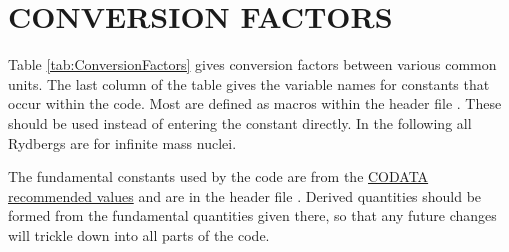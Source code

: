 \chapter{CONVERSION FACTORS}

Table \ref{tab:ConversionFactors} gives conversion factors between
various common units.
The last column of the table gives the variable names for
constants that occur within the code.
Most are defined as macros within the header file
.
These should be used instead of entering the constant directly.
In the following all Rydbergs are for infinite mass nuclei.

The fundamental constants used by the code are from the
\href{http://physics.nist.gov/cuu/Constants/index.html}{CODATA
recommended values}
and are in the header file .
Derived quantities should be
formed from the fundamental quantities given there, so that any future
changes will trickle down into all parts of the code.

